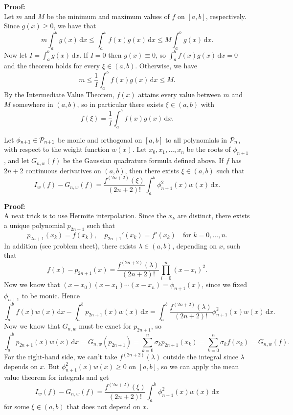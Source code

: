 \documentclass[
  letterpaper,
  DIV=11,
  numbers=noendperiod]{scrreprt}
\newenvironment{fbxSimple}[3]{\begin{tcolorbox}[enhanced, breakable,%
attach boxed title to top*={xshift=1.4pt},
boxed title style={boxrule=0.0mm, fuzzy shadow={1pt}{-1pt}{0mm}{0.1mm}{gray}, arc=.3em, rounded corners=east, sharp corners=west}, colframe=#1-color2, colbacktitle=#1-color1, colback = white, coltitle=black,  titlerule=0mm, toprule=0pt, bottomrule=.7pt, leftrule=.3em, rightrule=.7pt, outer arc=.3em,  	left=.5em, right=.5em, bottomtitle=1mm, toptitle=1mm,title=\textbf{#2}\hspace{0.5em}{#3}]}
{\end{tcolorbox}}
\begin{document}
\textbf{Proof:}\\
Let \(m\) and \(M\) be the minimum and maximum values of \(f\) on
\([a,b]\), respectively. Since \(g(x)\geq 0\), we have that \[
m\int_a^bg(x)\,\mathrm{d}x \leq \int_a^bf(x)g(x)\,\mathrm{d}x \leq M\int_a^bg(x)\,\mathrm{d}x.
\] Now let \(I=\int_a^bg(x)\,\mathrm{d}x\). If \(I=0\) then
\(g(x)\equiv 0\), so \(\int_a^bf(x)g(x)\,\mathrm{d}x=0\) and the theorem
holds for every \(\xi\in(a,b)\). Otherwise, we have \[
m \leq \frac{1}{I}\int_a^bf(x)g(x)\,\mathrm{d}x \leq M.
\] By the Intermediate Value Theorem, \(f(x)\) attains every value
between \(m\) and \(M\) somewhere in \((a,b)\), so in particular there
exists \(\xi\in(a,b)\) with \[
f(\xi) = \frac{1}{I}\int_a^bf(x)g(x)\,\mathrm{d}x.
\]

\label{error-estimate-for-gaussian-quadrature}
\begin{fbxSimple}{theorem}{Theorem 4.5: }{Error estimate for Gaussian quadrature}
\label{error-estimate-for-gaussian-quadrature}
Let \(\phi_{n+1}\in{\cal P}_{n+1}\) be monic and orthogonal on \([a,b]\)
to all polynomials in \({\cal P}_n\), with respect to the weight
function \(w(x)\). Let \(x_0,x_1,\ldots,x_n\) be the roots of
\(\phi_{n+1}\), and let \(G_{n,w}(f)\) be the Gaussian quadrature
formula defined above. If \(f\) has \(2n+2\) continuous derivatives on
\((a,b)\), then there exists \(\xi\in(a,b)\) such that \[
I_w(f) - G_{n,w}(f) = \frac{f^{(2n+2)}(\xi)}{(2n+2)!}\int_a^b\phi_{n+1}^2(x)w(x)\,\mathrm{d}x.
\]

\end{fbxSimple}

\textbf{Proof:}\\
A neat trick is to use Hermite interpolation. Since the \(x_k\) are
distinct, there exists a unique polynomial \(p_{2n+1}\) such that \[
p_{2n+1}(x_k) = f(x_k), \quad p_{2n+1}'(x_k) = f'(x_k) \quad \textrm{for $k=0,\ldots,n$}.
\] In addition (see problem sheet), there exists \(\lambda\in(a,b)\),
depending on \(x\), such that \[
f(x) - p_{2n+1}(x) = \frac{f^{(2n+2)}(\lambda)}{(2n+2)!}\prod_{i=0}^n(x-x_i)^2.
\] Now we know that \((x-x_0)(x-x_1)\cdots(x-x_n)=\phi_{n+1}(x)\), since
we fixed \(\phi_{n+1}\) to be monic. Hence \[
\int_a^bf(x)w(x)\,\mathrm{d}x - \int_a^bp_{2n+1}(x)w(x)\,\mathrm{d}x = \int_a^b\frac{f^{(2n+2)}(\lambda)}{(2n+2)!}\phi_{n+1}^2(x)w(x)\,\mathrm{d}x.
\] Now we know that \(G_{n,w}\) must be exact for \(p_{2n+1}\), so \[
\int_a^bp_{2n+1}(x)w(x)\,\mathrm{d}x = G_{n,w}(p_{2n+1}) = \sum_{k=0}^n\sigma_kp_{2n+1}(x_k) = \sum_{k=0}^n\sigma_kf(x_k)=G_{n,w}(f).
\] For the right-hand side, we can't take \(f^{(2n+2)}(\lambda)\)
outside the integral since \(\lambda\) depends on \(x\). But
\(\phi_{n+1}^2(x)w(x)\geq 0\) on \([a,b]\), so we can apply the mean
value theorem for integrals and get \[
I_w(f) - G_{n,w}(f) = \frac{f^{(2n+2)}(\xi)}{(2n+2)!}\int_a^b\phi_{n+1}^2(x)w(x)\,\mathrm{d}x
\] for some \(\xi\in(a,b)\) that does not depend on \(x\).
\end{document}
